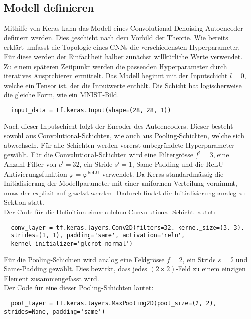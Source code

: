 \subsection{Modell definieren}
Mithilfe von Keras kann das Modell eines Convolutional-Denoising-Autoencoder
definiert werden. Dies geschieht nach dem Vorbild der Theorie.
Wie bereits erklärt umfasst die Topologie eines CNNs die verschiedensten Hyperparameter.
Für diese werden der Einfachheit halber zunächst willkürliche Werte verwendet.
Zu einem späteren Zeitpunkt werden die passenden Hyperparameter durch iteratives Ausprobieren ermittelt.
\para{}
Das Modell beginnt mit der Inputschicht $l=0$, welche ein Tensor ist, der
die Inputwerte enthält. Die Schicht hat logischerweise die gleiche Form, wie ein MNIST-Bild.
\begin{verbatim}
  input_data = tf.keras.Input(shape=(28, 28, 1))
\end{verbatim}
\para{}
Nach dieser Inputschicht folgt der Encoder des Autoencoders. Dieser besteht
sowohl aus Convolutional-Schichten, wie auch aus Pooling-Schichten, welche sich abwechseln.
Für alle Schichten werden vorerst unbegründete Hyperparameter gewählt.
Für die Convolutional-Schichten wird
eine Filtergrösse $f^l = 3$, eine Anzahl Filter von $c^l = 32$,
ein Stride $s^l=1$, Same-Padding und die ReLU-Aktivierungsfunktion $\varphi =
\varphi^{\text{ReLU}}$ verwendet.
Da Keras standardmässig die Initialisierung der Modellparameter mit einer
uniformen Verteilung vornimmt, muss der  explizit auf
 gesetzt werden. Dadurch findet die Initialisierung analog
zu Sektion  statt. \\
Der Code für die Definition einer solchen Convolutional-Schicht lautet:
\begin{verbatim}
  conv_layer = tf.keras.layers.Conv2D(filters=32, kernel_size=(3, 3),
  strides=(1, 1), padding='same', activation='relu',
  kernel_initializer='glorot_normal')
\end{verbatim}
Für die Pooling-Schichten wird analog eine Feldgrösse $f = 2$, ein
Stride $s = 2$ und Same-Padding gewählt. Dies bewirkt, dass jedes $(2
\times 2)$-Feld zu einem einzigen Element zusammengefasst wird. \\
Der Code für eine dieser Pooling-Schichten lautet:
\begin{verbatim}
  pool_layer = tf.keras.layers.MaxPooling2D(pool_size=(2, 2), strides=None, padding='same')
\end{verbatim}
